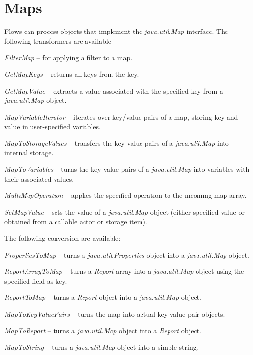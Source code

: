 \section{Maps}
Flows can process objects that implement the \textit{java.util.Map} interface.
The following transformers are available:
\begin{tight_itemize}
	\item \textit{FilterMap} -- for applying a filter to a map.
	\item \textit{GetMapKeys} -- returns all keys from the key.
	\item \textit{GetMapValue} -- extracts a value associated with the
	specified key from a \textit{java.util.Map} object.
  \item \textit{MapVariableIterator} -- iterates over key/value pairs of a map,
  storing key and value in user-specified variables.
	\item \textit{MapToStorageValues} -- transfers the key-value pairs of a
	\textit{java.util.Map} into internal storage.
	\item \textit{MapToVariables} -- turns the key-value pairs of a
	\textit{java.util.Map} into variables with their associated values.
	\item \textit{MultiMapOperation} -- applies the specified operation to
	the incoming map array.
	\item \textit{SetMapValue} -- sets the value of a \textit{java.util.Map}
	object (either specified value or obtained from a callable actor or storage item).
\end{tight_itemize}
The following conversion are available:
\begin{tight_itemize}
	\item \textit{PropertiesToMap} -- turns a \textit{java.util.Properties}
	object into a \textit{java.util.Map} object.
	\item \textit{ReportArrayToMap} -- turns a \textit{Report} array into a
	\textit{java.util.Map} object using the specified field as key.
	\item \textit{ReportToMap} -- turns a \textit{Report} object into a
	\textit{java.util.Map} object.
	\item \textit{MapToKeyValuePairs} -- turns the map into actual
	key-value pair objects.
  \item \textit{MapToReport} -- turns a \textit{java.util.Map} object into a
  \textit{Report} object.
  \item \textit{MapToString} -- turns a \textit{java.util.Map} object into a
  simple string.
\end{tight_itemize}


